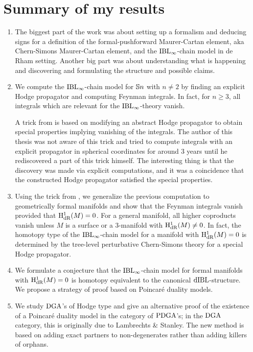 \documentclass[\MainFolder/Text.tex]{subfiles}
\begin{document}
\section{Summary of my results}

\begin{enumerate}[label=\arabic*)]

\item The biggest part of the work was about setting up a formalism and deducing signs for a definition of the formal-pushforward Maurer-Cartan element, aka Chern-Simons Maurer-Cartan element, and the $\mathrm{IBL}_\infty$-chain model in de Rham setting. Another big part was about understanding what is happening and discovering and formulating the structure and possible claims.

\item We compute the $\mathrm{IBL}_\infty$-chain model for $\mathbb{S}{n}$ with $n\neq 2$ by finding an explicit Hodge propagator and computing Feynman integrals. In fact, for $n\ge 3$, all integrals which are relevant for the $\mathrm{IBL}_\infty$-theory vanish.
 
A trick from \cite{Mnev2009} is based on modifying an abstract Hodge propagator to obtain special properties implying vanishing of the integrals. The author of this thesis was not aware of this trick and tried to compute integrals with an explicit propagator in spherical coordinates for around 3 years until he rediscovered a part of this trick himself. The interesting thing is that the discovery was made via explicit computations, and it was a coincidence that the constructed Hodge propagator satisfied the special properties.
 
\item Using the trick from \cite{Mnev2009}, we generalize the previous computation to geometrically formal manifolds and show that the Feynman integrals vanish provided that $\mathrm{H}_{\mathrm{dR}}^1(M) = 0$. For a general manifold, all higher coproducts vanish unless $M$ is a surface or a $3$-manifold with $\mathrm{H}_{\mathrm{dR}}^1(M) \neq 0$. In fact, the homotopy type of the $\mathrm{IBL}_\infty$-chain model for a manifold with $\mathrm{H}_{\mathrm{dR}}^1(M) = 0$ is determined by the tree-level perturbative Chern-Simons theory for a special Hodge propagator.

\item We formulate a conjecture that the $\mathrm{IBL}_\infty$-chain model for formal manifolds with $\mathrm{H}_{\mathrm{dR}}^1(M) = 0$ is homotopy equivalent to the canonical $\mathrm{dIBL}$-structure. We propose a strategy of proof based on Poincar\'e duality models.

\item We study $\mathrm{DGA}$'s of Hodge type and give an alternative proof of the existence of a Poincar\'e duality model in the category of $\mathrm{PDGA}$'s; in the $\mathrm{DGA}$ category, this is originally due to Lambrechts \& Stanley. The new method is based on adding exact partners to non-degenerates rather than adding killers of orphans.
 

\end{enumerate}
\end{document}
